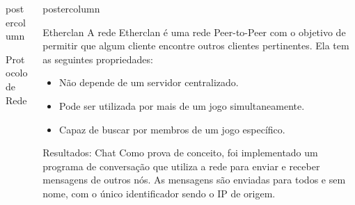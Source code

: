 \documentclass[final]{beamer}
\newlength{\columnheight}
\begin{document}
\begin{frame}
\begin{columns}
\begin{column}{.5\textwidth}
\begin{beamercolorbox}[center,wd=\textwidth]{postercolumn}
\begin{minipage}[T]{.95\textwidth}
{\begin{block}{Protocolo de Rede}
                \vspace*{0.2cm} 
            \end{block}
          }
        \end{minipage}
      \end{beamercolorbox}
    \end{column}

    \begin{column}{.5\textwidth}
      \begin{beamercolorbox}[center,wd=\textwidth]{postercolumn}
        \begin{minipage}[T]{.95\textwidth} %
          \parbox[t][\columnheight]{\textwidth}{ %
            
            \vspace*{0.2cm} 
            \begin{block}{Etherclan}
                A rede Etherclan é uma rede Peer-to-Peer com o objetivo de permitir que algum cliente encontre outros clientes
                pertinentes. Ela tem as seguintes propriedades:
                
                \begin{itemize}
                  \item Não depende de um servidor centralizado.
                  \item Pode ser utilizada por mais de um jogo simultaneamente.
                  \item Capaz de buscar por membros de um jogo específico.
                \end{itemize}
                
                \vspace*{0.2cm} 
            \end{block}

            \vspace*{0.2cm} 
            
            \begin{block}{Resultados: Chat}
              \justifying 
                Como prova de conceito, foi implementado um programa de conversação que utiliza a rede para enviar e receber
                mensagens de outros nós. As mensagens são enviadas para todos e sem nome, com o único identificador sendo o IP
                de origem.
                

\end{block}}
\end{minipage}
\end{beamercolorbox}
\end{column}
\end{columns}
\end{frame}
\end{document}
